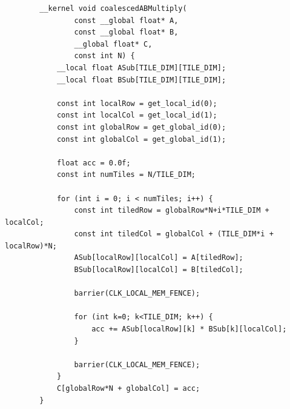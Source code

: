 \documentclass[review=false, sigchi]{acmart}
\begin{document}
\begin{appendix}
		\begin{lstlisting}
		__kernel void coalescedABMultiply(
				const __global float* A,
				const __global float* B,
				__global float* C,
				const int N) {
			__local float ASub[TILE_DIM][TILE_DIM];
			__local float BSub[TILE_DIM][TILE_DIM];    
			
			const int localRow = get_local_id(0);
			const int localCol = get_local_id(1);
			const int globalRow = get_global_id(0);
			const int globalCol = get_global_id(1);
			
			float acc = 0.0f;
			const int numTiles = N/TILE_DIM;
			
			for (int i = 0; i < numTiles; i++) {
				const int tiledRow = globalRow*N+i*TILE_DIM + localCol;
				const int tiledCol = globalCol + (TILE_DIM*i + localRow)*N;
				ASub[localRow][localCol] = A[tiledRow];
				BSub[localRow][localCol] = B[tiledCol];
				
				barrier(CLK_LOCAL_MEM_FENCE);
				
				for (int k=0; k<TILE_DIM; k++) {
					acc += ASub[localRow][k] * BSub[k][localCol];
				}
				
				barrier(CLK_LOCAL_MEM_FENCE);
			}
			C[globalRow*N + globalCol] = acc;
		}
		\end{lstlisting}
	\end{appendix}
	
\end{document}
